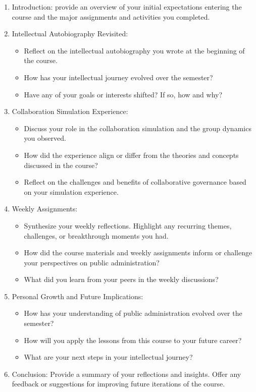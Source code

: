 \documentclass[12pt, letterpaper]{article}
\begin{document}
\begin{enumerate}
    \item Introduction: provide an overview of your initial expectations entering the course and the major assignments and activities you completed.
    \item Intellectual Autobiography Revisited: 
        \begin{itemize}
            \item Reflect on the intellectual autobiography you wrote at the beginning of the course.
            \item How has your intellectual journey evolved over the semester?
            \item Have any of your goals or interests shifted? If so, how and why?
        \end{itemize}
    \item Collaboration Simulation Experience:
        \begin{itemize}
            \item Discuss your role in the collaboration simulation and the group dynamics you observed.
            \item How did the experience align or differ from the theories and concepts discussed in the course?
            \item Reflect on the challenges and benefits of collaborative governance based on your simulation experience.
        \end{itemize}

    \item Weekly Assignments:
        \begin{itemize}
            \item Synthesize your weekly reflections. Highlight any recurring themes, challenges, or breakthrough moments you had.
            \item How did the course materials and weekly assignments inform or challenge your perspectives on public administration?
            \item What did you learn from your peers in the weekly discussions?
        \end{itemize}

    \item Personal Growth and Future Implications:
        \begin{itemize}
            \item How has your understanding of public administration evolved over the semester?
            \item How will you apply the lessons from this course to your future career?
            \item What are your next steps in your intellectual journey?
        \end{itemize}

    \item Conclusion: Provide a summary of your reflections and insights. Offer any feedback or suggestions for improving future iterations of the course.
    
\end{enumerate}
\end{document}
